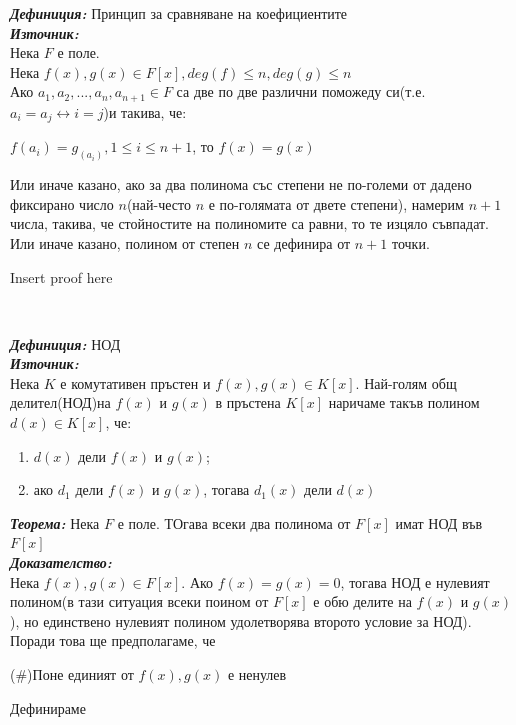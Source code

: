 \documentclass[11pt]{article} %
\newcommand{\italicBold}[1]{\textbf{\emph{#1}}}
\newcommand{\definition}{\italicBold{Дефиниция: }}
\newcommand{\theorem}{\italicBold{Теорема: }}
\newcommand{\proof}{\italicBold{Доказателство: }}
\newcommand{\source}{\italicBold{Източник: }}
\newcommand{\enumNum}{\renewcommand{\theenumi}{\arabic{enumi}}}
\begin{document}
\definition Принцип за сравняване на коефициентите\\
\source {}\\
Нека $F$ е поле.\\
Нека $f(x), g(x) \in F[x], deg(f) \leq n, deg(g) \leq n$\\
Ако $a_{1}, a_{2},..., a_{n}, a_{n+1} \in F$ са две по две различни поможеду си(т.е. $a_{i} = a_{j} \leftrightarrow i=j$)и такива, че: \\

\centerline{$f(a_{i}) = g_(a_{i}), 1 \leq i \leq n+1$, то $f(x) = g(x)$}

Или иначе казано, ако за два полинома със степени не по-големи от дадено фиксирано число $n$(най-често $n$ е по-голямата от двете степени), намерим $n+1$ числа, такива, че стойностите на полиномите са равни, то те изцяло съвпадат.\\
Или иначе казано, полином от степен $n$ се дефинира от $n+1$ точки.\\
\centerline{Insert proof here}\\\par

\definition НОД\\
\source {}\\

Нека $K$ е комутативен пръстен и $f(x), g(x) \in K[x]$. Най-голям общ делител(НОД)на $f(x)$ и $g(x)$ в пръстена $K[x]$ наричаме такъв полином $d(x) \in K[x]$, че:

\enumNum
\begin{enumerate}
	\item $d(x)$ дели $f(x)$ и $g(x)$;\\
	\item ако $d_{1}$ дели $f(x)$ и $g(x)$, тогава $d_{1}(x)$ дели $d(x)$ \\\par
\end{enumerate}

\theorem Нека $F$ е поле. ТОгава всеки два полинома от $F[x]$ имат НОД във $F[x]$\\
\proof \\
Нека $f(x), g(x) \in F[x]$. Ако $f(x) = g(x) = 0$, тогава НОД е нулевият полином(в тази ситуация всеки поином от $F[x]$ е обю делите на $f(x)$ и $g(x)$), но единствено нулевият полином удолетворява второто условие за НОД). Поради това ще предполагаме, че \\
\centerline{(\#)Поне единият от $f(x), g(x)$ е ненулев}
Дефинираме \\
\end{document}

